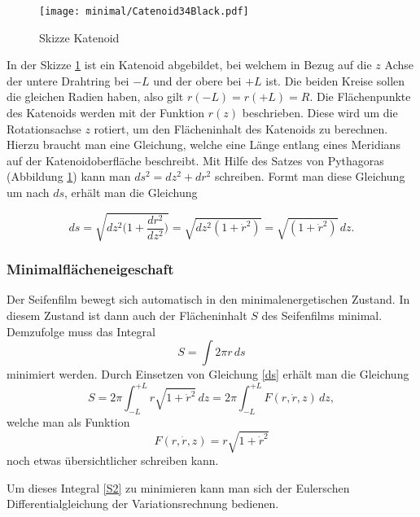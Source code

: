 \begin{refsection}
\begin{figure}
  \centering
  \texttt{[image: minimal/Catenoid34Black.pdf]}
  \caption{Skizze Katenoid} 
  \label{Katenoid}
\end{figure}
In der Skizze \ref{Katenoid} ist ein Katenoid abgebildet, bei welchem in Bezug auf die $z$ Achse der untere Drahtring bei $-L$ und der obere bei $+L$ ist. 
Die beiden Kreise sollen die gleichen Radien haben, also gilt $r(-L)=r(+L)=R$. 
Die Flächenpunkte des Katenoids werden mit der Funktion $r(z)$ beschrieben. Diese wird um die Rotationsachse $z$ rotiert, um den Flächeninhalt des Katenoids zu berechnen.
Hierzu braucht man eine Gleichung, welche eine Länge entlang eines Meridians auf der Katenoidoberfläche beschreibt. 
Mit Hilfe des Satzes von Pythagoras (Abbildung \ref{Katenoid}) kann man $ds^2=dz^2+dr^2$ schreiben.
Formt man diese Gleichung um nach $ds$, erhält man die Gleichung

\begin{equation} \label{ds}
  ds=\sqrt{dz^2\bigg(1+\frac{dr^2}{dz^2}\bigg)}= \sqrt{dz^2(1+\dot r^2)}=\sqrt{(1+\dot r^2)}\,dz .
\end{equation}
\subsubsection{Minimalflächeneigeschaft}
Der Seifenfilm bewegt sich automatisch in den minimalenergetischen Zustand. 
In diesem Zustand ist dann auch der Flächeninhalt $S$ des Seifenfilms minimal.
Demzufolge muss das Integral 
\begin{equation} \label{S1}  
  S= \int 2 \pi r \,ds 
\end{equation}
minimiert werden. 
Durch Einsetzen von Gleichung \eqref{ds} erhält man die Gleichung 
\begin{equation} \label{S2}
  S=2 \pi \int_{-L}^{+L} r\sqrt{1+\dot r^2}\,dz =2 \pi \int_{-L}^{+L}  F(r,\dot r, z) \,dz  ,
\end{equation}
welche man als Funktion 
\begin{equation} \label{F}
 F(r,\dot r, z) = r \sqrt{1+\dot r^2}
\end{equation}
noch etwas übersichtlicher schreiben kann.



Um dieses Integral \eqref{S2} zu minimieren kann man sich der Eulerschen Differentialgleichung der Variationsrechnung bedienen. 

\end{refsection}
